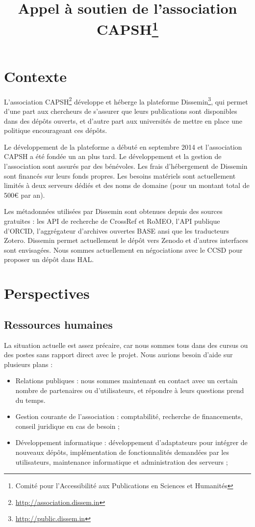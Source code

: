 \documentclass[a4paper]{article}
\title{Appel à soutien de l'association CAPSH\footnote{Comité pour l'Accessibilité aux Publications en Sciences et Humanités}}
\begin{document}
\maketitle

\section{Contexte}

L'association CAPSH\footnote{\url{http://association.dissem.in}} développe
et héberge la plateforme Dissemin\footnote{\url{http://public.dissem.in}}, qui permet d'une part aux chercheurs
de s'assurer que leurs publications sont disponibles dans des dépôts ouverts, et d'autre part aux
universités de mettre en place une politique encourageant ces dépôts.

Le développement de la plateforme a débuté en septembre 2014 et l'association CAPSH a été fondée un an plus tard. Le développement et la gestion de l'association sont assurés par des bénévoles. Les frais d'hébergement de Dissemin sont financés sur leurs fonds propres.
Les besoins matériels sont actuellement limités à deux serveurs dédiés et des noms de domaine (pour un montant total de 500\euro{}
par an).

Les métadonnées utilisées par Dissemin sont obtenues depuis des sources gratuites : les API de recherche de CrossRef et RoMEO, l'API publique d'ORCID, l'aggrégateur d'archives ouvertes BASE ansi que les traducteurs Zotero. Dissemin permet actuellement le dépôt vers Zenodo et d'autres interfaces sont envisagées. Nous sommes actuellement en négociations avec le CCSD pour proposer un dépôt dans HAL.

\section{Perspectives}

\subsection{Ressources humaines}

La situation actuelle est assez précaire, car nous sommes tous dans des cursus ou des postes sans rapport direct avec le projet. Nous aurions besoin d'aide sur plusieurs plans :
\begin{itemize}
   \item Relations publiques : nous sommes maintenant en contact avec un certain nombre de partenaires ou d'utilisateurs, et répondre à leurs questions prend du temps.%
   \item Gestion courante de l'association : comptabilité, recherche de financements, conseil juridique en cas de besoin ;
   \item Développement informatique : développement d'adaptateurs pour intégrer de nouveaux dépôts, implémentation de fonctionnalités demandées par les utilisateurs, maintenance informatique et administration des serveurs ;
\end{itemize}
\end{document}
